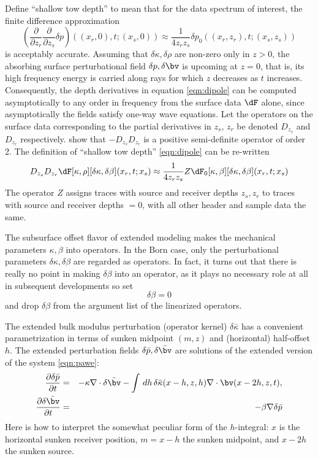 Define ``shallow tow depth'' to mean that for the data
spectrum of interest, the finite difference approximation 
\begin{equation}
\label{eqn:dipole}
\left(\frac{\partial}{\partial z_r}\frac{\partial}{\partial
  z_s}\delta p\right)((x_r,0),t; (x_s,0)) \approx
\frac{1}{4z_rz_s}\delta p_0((x_r,z_r),t;(x_s,z_s))
\end{equation}
is acceptably accurate.  
Assuming that $\delta \kappa, \delta \rho$ are non-zero only in $z>0$,
the absorbing surface perturbational field $\delta p,\delta \bv$ is
upcoming at $z=0$, that is, its high frequency energy is carried along
rays for which $z$ decreases as $t$ increases. Consequently, the depth
derivatives in equation \ref{eqn:dipole} can be computed
asymptotically to any order in frequency from the surface data $\dF$
alone, since asymptotically the fields satisfy one-way wave
equations. Let the operators on the surface data corresponding to the
partial derivatives in $z_s$, $z_r$ be denoted $D_{z_s}$ and $D_{z_r}$
respectively. \cite{HouSymes:15} show that $-D_{z_s}D_{z_r}$ is a
positive semi-definite operator of order 2. The definition of
``shallow tow depth'' \ref{eqn:dipole}
can be re-written
\begin{equation}
\label{eqn:opdipole}
D_{z_s}D_{z_r}\dF[\kappa,\rho][\delta \kappa,\delta \beta](x_r,t;x_s) \approx 
\frac{1}{4z_rz_s} Z \dF_0[\kappa,\beta][\delta \kappa,\delta \beta](x_r,t;x_s) 
\end{equation}
The operator $Z$ assigns traces with source and receiver depths $z_s,
z_r$ to traces with source and receiver depths $=0$, with all other
header and sample data the same.

The subsurface offset flavor of extended modeling makes the mechanical
parameters $\kappa,\beta$ into operators. In the Born case, only the
perturbational parameters $\delta \kappa,\delta \beta$ are regarded as
operators. In fact, it turns out that there is really no point in
making $\delta \beta$ into an operator, as it plays no necessary role at
all in subsequent developments so set
\begin{equation}
\label{eqn:zerodbeta}
\delta \beta = 0
\end{equation}
and drop $\delta \beta$ from the argument list of the linearized operators.

The extended bulk modulus
perturbation (operator kernel) $\delta \bar{\kappa}$ has a convenient
parametrization in terms of sunken midpoint $(m,z)$ and (horizontal)
half-offset $h$. The extended perturbation fields
$\delta \bar{p}, \delta \bar{\bv}$ are solutions of the extended
version of the system \ref{eqn:pawe}:
\begin{eqnarray}
\label{eqn:pawe}
\frac{\partial \delta \bar{p}}{\partial t}& =& -\kappa \nabla \cdot \delta \bar{\bv} -
\int\,dh\,\delta \bar{\kappa}(x-h,z,h) \nabla \cdot \bv(x-2h,z,t),\nonumber \\
\frac{\partial \delta \bar{\bv}}{\partial t} & = & -\beta \nabla \delta \bar{p} 
\end{eqnarray}  
Here is how to interpret the somewhat peculiar form of the
$h$-integral: $x$ is the horizontal sunken receiver position, $m=x-h$ the
sunken midpoint, and $x-2h$ the sunken source. 

